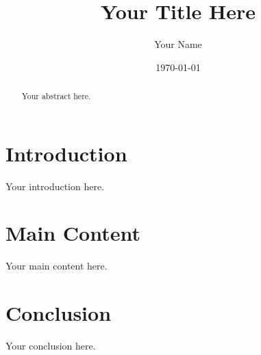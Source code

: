 \documentclass{article}
\title{Your Title Here}
\author{Your Name}
\date{\today}
\begin{document}
\maketitle

\begin{abstract}
Your abstract here.
\end{abstract}

\section{Introduction}
Your introduction here. \cite{example}

\section{Main Content}
Your main content here.

\section{Conclusion}
Your conclusion here.



\end{document}
